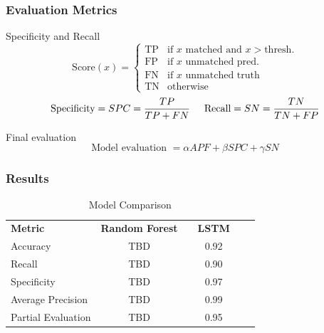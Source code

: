 \documentclass[10pt]{beamer}
\begin{document}
\begin{frame}
  \frametitle{Evaluation Metrics}
  \begin{block}{Specificity and Recall}
    \[
    \text{Score}(x) = 
    \begin{cases} 
      \text{TP} & \text{if }x \text{ matched and } x > \text{thresh.} \\
      \text{FP} & \text{if }x \text{ unmatched pred.} \\
      \text{FN} & \text{if }x \text{ unmatched truth} \\
      \text{TN} & \text{otherwise}
    \end{cases}
    \]
    \begin{equation*}
      \text{Specificity} = SPC = \frac{TP}{TP+FN} \hspace{5mm} \text{Recall} = SN = \frac{TN}{TN+FP}
    \end{equation*}
  \end{block}
  \begin{block}{Final evaluation}
    \begin{equation*}
      \text{Model evaluation } = \alpha APF + \beta SPC + \gamma SN 
    \end{equation*}
  \end{block}
\end{frame}


\begin{frame}
    \frametitle{Results}
    \begin{block}{}
        \begin{table}[h]
            \centering
            \caption{Model Comparison}
            \label{tab:model_comparison}
            \begin{tabular}{lccccc}
                \hline
                \textbf{Metric} & \textbf{Random Forest} & & \textbf{LSTM} & \\
                \cline{2-5}
                Accuracy & TBD & & 0.92 & \\
                Recall & TBD & & 0.90 & \\
                Specificity & TBD & & 0.97 & \\
                Average Precision & TBD & & 0.99 & \\
                Partial Evaluation & TBD & & 0.95 & \\
                \hline
            \end{tabular}
        \end{table}
    \end{block} 
\end{frame}
\end{document}
